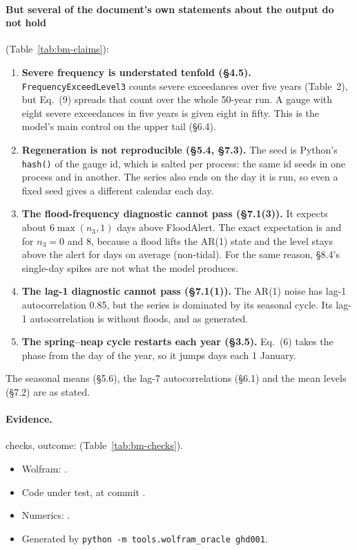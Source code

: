 \documentclass[11pt,a4paper]{article}
\begin{document}
\paragraph{But several of the document's own statements about the output do not
hold} (Table~\ref{tab:bm-claims}):
\begin{enumerate}[leftmargin=*]
\item \textbf{Severe frequency is understated tenfold (\S4.5).}
  \texttt{FrequencyExceedLevel3} counts severe exceedances over five years (Table~2),
  but Eq.~(9) spreads that count over the whole 50-year run. A gauge with eight severe
  exceedances in five years is given eight in fifty. This is the model's main control
  on the upper tail (\S6.4).
\item \textbf{Regeneration is not reproducible (\S5.4, \S7.3).} The seed is Python's
  \texttt{hash()} of the gauge id, which is salted per process: the same id seeds
  \bmSeedOne{} in one process and \bmSeedTwo{} in another. The series also ends on
  the day it is run, so even a fixed seed gives a different calendar each day.
\item \textbf{The flood-frequency diagnostic cannot pass (\S7.1(3)).} It expects about
  $6\max(n_3,1)$ days above FloodAlert. The exact expectation is \bmAlertZero{} and
  \bmAlertEight{} for $n_3=0$ and 8, because a flood lifts the AR(1) state and the
  level stays above the alert for \bmPerEvent{} days on average (non-tidal). For the
  same reason, \S8.4's single-day spikes are not what the model produces.
\item \textbf{The lag-1 diagnostic cannot pass (\S7.1(1)).} The AR(1) noise has lag-1
  autocorrelation 0.85, but the series is dominated by its seasonal cycle. Its lag-1
  autocorrelation is \bmLagExact{} without floods, and \bmLagModel{} as generated.
\item \textbf{The spring--neap cycle restarts each year (\S3.5).} Eq.~(6) takes the
  phase from the day of the year, so it jumps \bmJump{} days each 1 January.
\end{enumerate}
The seasonal means (\S5.6), the lag-7 autocorrelations (\S6.1) and the mean levels
(\S7.2) are as stated.

\paragraph{Evidence.} \bmChecks{} checks, outcome: \bmOutcome{}
(Table~\ref{tab:bm-checks}).
\begin{itemize}[leftmargin=*,nosep]
\item Wolfram: \bmWolfram{}\bmWolframVia.
\item Code under test, at commit \bmCodeCommit{}\bmCodeDirty.
\item Numerics: \bmNumerics.
\item Generated \bmGenerated{} by \texttt{python -m tools.wolfram\_oracle ghd001}.
\end{itemize}
\end{document}
